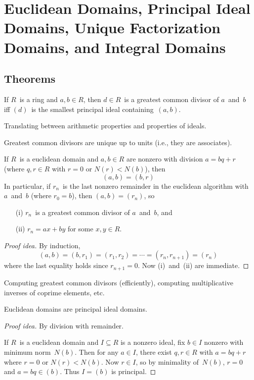 %
%
%
\section[EDs, PIDs, UFDs, and IDs]{Euclidean Domains, Principal Ideal Domains, Unique Factorization Domains, and Integral Domains}
\subsection*{Theorems}
\begin{thm}
If \(R\)~is a ring and \(a,b\in R\), then \(d\in R\)~is a greatest common divisor of \(a\)~and~\(b\) iff \((d)\)~is the smallest principal ideal containing~\((a,b)\). 
\end{thm}
\begin{app}
Translating between arithmetic properties and properties of ideals.
\end{app}
\begin{cor}
Greatest common divisors are unique up to units (i.e., they are associates).
\end{cor}

\begin{thm}
If \(R\)~is a euclidean domain and \(a,b\in R\) are nonzero with division \(a=bq+r\) (where \(q,r\in R\) with \(r=0\) or \(N(r)<N(b)\)), then
\[(a,b)=(b,r)\]
In particular, if \(r_n\)~is the last nonzero remainder in the euclidean algorithm with \(a\)~and~\(b\) (where \(r_0=b\)), then \((a,b)=(r_n)\), so
\begin{enumerate}[itemsep=0pt]
\item[(i)] \(r_n\)~is a greatest common divisor of \(a\)~and~\(b\), and
\item[(ii)] \(r_n=ax+by\) for some \(x,y\in R\).
\end{enumerate}
\end{thm}
\begin{proof}[Proof idea]
By induction,
\[(a,b)=(b,r_1)=(r_1,r_2)=\cdots=(r_n,r_{n+1})=(r_n)\]
where the last equality holds since \(r_{n+1}=0\). Now (i)~and~(ii) are immediate.
\end{proof}
\begin{app}
Computing greatest common divisors (efficiently), computing multiplicative inverses of coprime elements, etc.
\end{app}

\begin{thm}
Euclidean domains are principal ideal domains.
\end{thm}
\begin{proof}[Proof idea]
By division with remainder.

If \(R\)~is a euclidean domain and \(I\subseteq R\) is a nonzero ideal, fix \(b\in I\) nonzero with minimum norm~\(N(b)\). Then for any \(a\in I\), there exist \(q,r\in R\) with \(a=bq+r\) where \(r=0\) or \(N(r)<N(b)\). Now \(r\in I\), so by minimality of~\(N(b)\), \(r=0\) and \(a=bq\in(b)\). Thus \(I=(b)\) is principal.
\end{proof}

